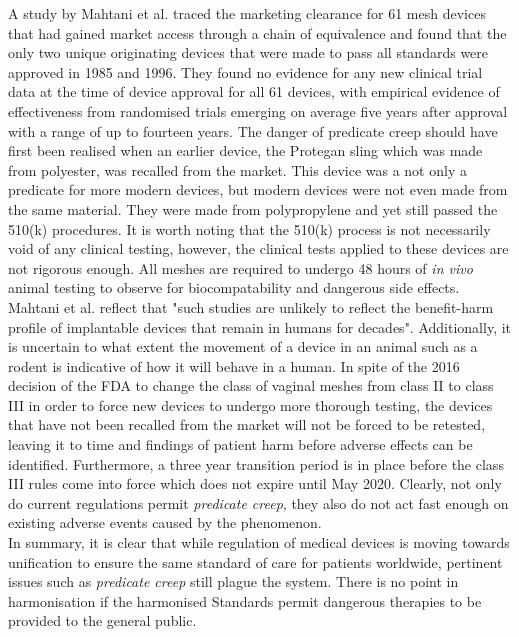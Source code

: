 \documentclass[12pt, openany, oneside]{book}
\begin{document}
A study by Mahtani et al. \citep{heneghan2017transvaginal} traced the marketing clearance for 61 mesh devices that had gained market access through a chain of equivalence and found that the only two unique originating devices that were made to pass all standards were approved in 1985 and 1996. They found no evidence for any new clinical trial data at the time of device approval for all 61 devices, with empirical evidence of effectiveness from randomised trials emerging on average five years after approval with a range of up to fourteen years. The danger of predicate creep should have first been realised when an earlier device, the Protegan sling which was made from polyester, was recalled from the market. This device was a not only a predicate for more modern devices, but modern devices were not even made from the same material. They were made from polypropylene and yet still passed the 510(k) procedures. It is worth noting that the 510(k) process is not necessarily void of any clinical testing, however, the clinical tests applied to these devices are not rigorous enough. All meshes are required to undergo 48 hours of \textit{in vivo} animal testing to observe for biocompatability and dangerous side effects. Mahtani et al. reflect that "such studies are unlikely to reflect the benefit-harm profile of implantable devices that remain in humans for decades". Additionally, it is uncertain to what extent the movement of a device in an animal such as a rodent is indicative of how it will behave in a human. In spite of the 2016 decision of the FDA to change the class of vaginal meshes from class II to class III in order to force new devices to undergo more thorough testing, the devices that have not been recalled from the market will not be forced to be retested, leaving it to time and findings of patient harm before adverse effects can be identified. Furthermore, a three year transition period is in place before the class III rules come into force which does not expire until May 2020. Clearly, not only do current regulations permit \textit{predicate creep}, they also do not act fast enough on existing adverse events caused by the phenomenon.\\

In summary, it is clear that while regulation of medical devices is moving towards unification to ensure the same standard of care for patients worldwide, pertinent issues such as \textit{predicate creep} still plague the system. There is no point in harmonisation if the harmonised Standards permit dangerous therapies to be provided to the general public.
\end{document}
